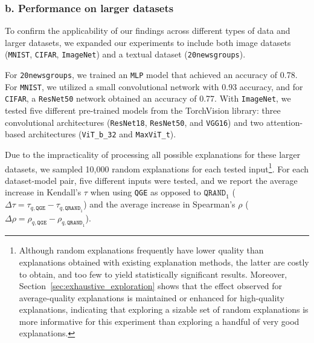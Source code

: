 \subsubsection{b. Performance on larger datasets}\label{sec:large_dataset_exploration}
To confirm the applicability of our findings across different types of data and larger datasets, we expanded our experiments to include both image datasets (\texttt{MNIST}, \texttt{CIFAR}, \texttt{ImageNet}) and a textual dataset (\texttt{20newsgroups}).%


For \texttt{20newsgroups}, we trained an \texttt{MLP} model that achieved an accuracy of 0.78. For \texttt{MNIST}, we utilized a small convolutional network with 0.93 accuracy, and for \texttt{CIFAR}, a \texttt{ResNet50} network obtained an accuracy of 0.77. With \texttt{ImageNet}, we tested five different pre-trained models from the TorchVision library: three convolutional architectures (\texttt{ResNet18}, \texttt{ResNet50}, and \texttt{VGG16}) and two attention-based architectures (\texttt{ViT\_b\_32} and \texttt{MaxViT\_t}).

Due to the impracticality of processing all possible explanations for these larger datasets, we sampled 10,000 random explanations for each tested input\footnote{Although random explanations frequently have lower quality than explanations obtained with existing explanation methods, the latter are costly to obtain, and too few to yield statistically significant results. Moreover, Section~\ref{sec:exhaustive_exploration} shows that the effect observed for average-quality explanations is maintained or enhanced for high-quality explanations, indicating that exploring a sizable set of random explanations is more informative for this experiment than exploring a handful of very good explanations.}. For each dataset-model pair, five different inputs were tested, and we report the average increase in Kendall's $\tau$ when using \texttt{QGE} as opposed to $\texttt{QRAND}_1$ ($\Delta \tau=\tau_{q,\texttt{QGE}}-\tau_{q,\texttt{QRAND}_1}$) and the average 
 increase in Spearman's $\rho$ ($\Delta\rho=\rho_{q,\texttt{QGE}}-\rho_{q,\texttt{QRAND}_1}$).

